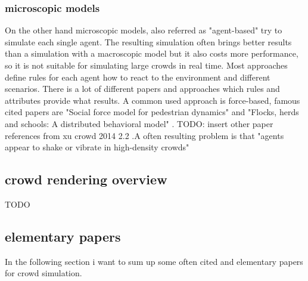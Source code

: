 \documentclass[sigconf]{acmart}
\begin{document}
\subsubsection{\textbf{microscopic models}}
On the other hand microscopic models, also referred as "agent-based"\cite{xu_crowd_2014} try to simulate each single agent. The resulting simulation often brings better results than a simulation with a macroscopic model but it also costs more performance, so it is not suitable for simulating large crowds in real time. Most approaches define rules for each agent how to react to the environment and different scenarios. There is a lot of different papers and approaches which rules and attributes provide what results. A common used approach is force-based, famous cited papers are "Social force model for pedestrian dynamics" \cite{helbing_social_1995} and "Flocks, herds and schools: A distributed behavioral model" \cite{reynolds_flocks_1987}. TODO: insert other paper references from xu crowd 2014 2.2 .A often resulting problem is that "agents appear to shake or vibrate in high-density crowds"\cite{xu_crowd_2014}

\cite{xu_crowd_2014}\cite{thalmann_crowd_2013}

\subsection{crowd rendering overview}
TODO
\subsection{elementary papers}
In the following section i want to sum up some often cited and elementary papers for crowd simulation. 
\end{document}
